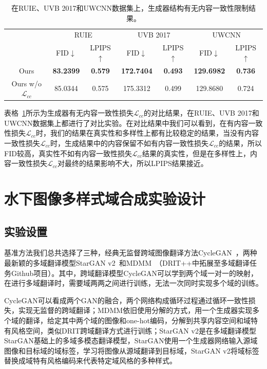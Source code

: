 \begin{table}[htbp]
  \centering
  \caption{在RUIE、UVB 2017和UWCNN数据集上，生成器结构有无内容一致性限制结果。}
    \begin{tabular}{c|c|c|c|c|c|c}
    \hline
    \multirow{2}[3]{*}{} & \multicolumn{2}{c|}{RUIE} & \multicolumn{2}{c|}{UVB 2017} & \multicolumn{2}{c}{UWCNN} \\
\cmidrule{2-7}          & \multicolumn{1}{c|}{FID$\downarrow$ } & \multicolumn{1}{c|}{LPIPS$\uparrow$} & \multicolumn{1}{c|}{FID$\downarrow$ } & \multicolumn{1}{c|}{LPIPS$\uparrow$} & \multicolumn{1}{c|}{FID$\downarrow$ } & LPIPS$\uparrow$ \\
    \midrule
    Ours  & \textbf{83.2399} & \textbf{0.579} & \textbf{172.7404} & \textbf{0.493} & \textbf{129.6982} & \textbf{0.736} \\
    Ours w/o $\mathcal{L}_{cc}$ & 85.0344 & 0.575 & 175.3312 & 0.499 & 129.8680 & 0.724 \\
    \hline
    \end{tabular}%
  \label{tab:ablation_modal_lcc}%
\end{table}%

表格~\ref{tab:ablation_modal_lcc}所示为生成器有无内容一致性损失$\mathcal{L}_{cc}$的对比结果，在RUIE、UVB 2017和UWCNN数据集上都进行了对比实验。在对比结果中我们可以看到，在有内容一致性损失$\mathcal{L}_{cc}$时，我们的结果在真实性和多样性上都有比较稳定的结果，当没有内容一致性损失$\mathcal{L}_{cc}$时，生成结果中的内容保留不如有内容一致性损失$\mathcal{L}_{cc}$的结果，所以FID较高，真实性不如有内容一致性损失$\mathcal{L}_{cc}$结果的真实性，但是在多样性上，内容一致性损失$\mathcal{L}_{cc}$对最终的结果影响不大，所以LPIPS结果接近。

\section{水下图像多样式域合成实验设计}
\subsection{实验设置}
基准方法我们总共选择了三种，经典无监督跨域图像翻译方法CycleGAN~\cite{zhu2017unpaired}，两种最新颖的多域翻译模型StarGAN v2~\cite{choi2020stargan}和MDMM~\cite{lee2020drit++}（DRIT++中拓展至多域翻译任务Github项目）。其中，跨域翻译模型CycleGAN可以学到两个域一对一的映射，在进行多域翻译时，需要域两两之间进行训练，无法一次同时实现多个域的训练。

CycleGAN可以看成两个GAN的融合，两个网络构成循环过程通过循环一致性损失，实现无监督的跨域翻译；MDMM依旧使用分解的方式，用一个生成器实现多个域的翻译，给定其中两个域的图像和one-hot编码，分解到共享内容空间和域特有风格空间，类似DRIT跨域翻译方式进行训练；StarGAN v2是在多域翻译模型StarGAN基础上的多域多模态翻译模型，StarGAN使用一个生成器网络输入源域图像和目标域的域标签，学习将图像从源域翻译到目标域，StarGAN v2将域标签替换成域特有风格编码来代表特定域风格的多种样式。

